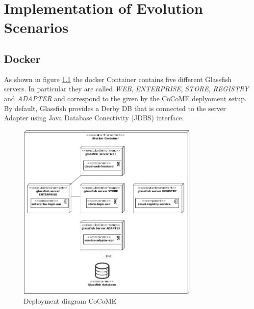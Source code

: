 \chapter{Implementation of Evolution Scenarios}
\section{Docker}
 	As shown in figure \ref*{Deploym_CoCoME} the docker Container contains five different Glassfish servers. In particular they are called \textit{WEB}, \textit{ENTERPRISE}, \textit{STORE}, \textit{REGISTRY} and \textit{ADAPTER} and correspond to the given by the CoCoME deplyoment setup. By default, Glassfish provides a Derby DB that is connected to the server Adapter using Java Database Conectivity (JDBS) interface.\\
 	\begin{figure}[h]
 		\centering
 		\includegraphics[width = 0.8\textwidth]{img/docker_Container_Deployment.png}
 		\caption{Deployment diagram CoCoME}
 		\label{Deploym_CoCoME}
 	\end{figure}
 	
